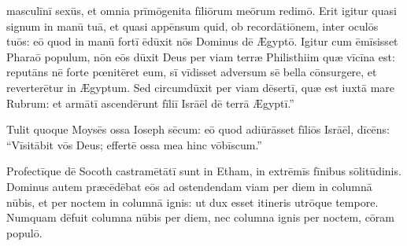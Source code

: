masculīnī sexūs, et omnia prīmōgenita fīliōrum meōrum
redimō. Erit igitur quasi signum in manū tuā, et quasi
appēnsum quid, ob
recordātiōnem, inter
oculōs tuōs: eō quod in manū fortī ēdūxit nōs Dominus dē Ægyptō. Igitur
cum ēmīsisset Pharaō populum, nōn eōs dūxit Deus per viam terræ Philisthiim
quæ vīcīna est: reputāns nē forte
pœnitēret eum, sī vīdisset adversum sē bella
cōnsurgere, et reverterētur in Ægyptum. Sed
circumdūxit per viam dēsertī, quæ est iuxtā mare Rubrum:
et armātī ascendērunt fīliī Isrāēl dē terrā Ægyptī.''

Tulit quoque Moysēs
ossa Ioseph sēcum: eō quod adiūrāsset fīliōs Isrāēl,
dīcēns: ``Vīsitābit vōs Deus;
effertē ossa mea hinc vōbīscum.''

Profectīque dē Socoth castramētātī sunt in Etham, in
extrēmīs fīnibus sōlitūdinis. Dominus autem præcēdēbat
eōs ad ostendendam viam per diem in columnā nūbis, et per noctem in columnā
ignis: ut dux esset itineris utrōque tempore. Numquam dēfuit columna
nūbis per diem, nec columna ignis per noctem, cōram populō. 

